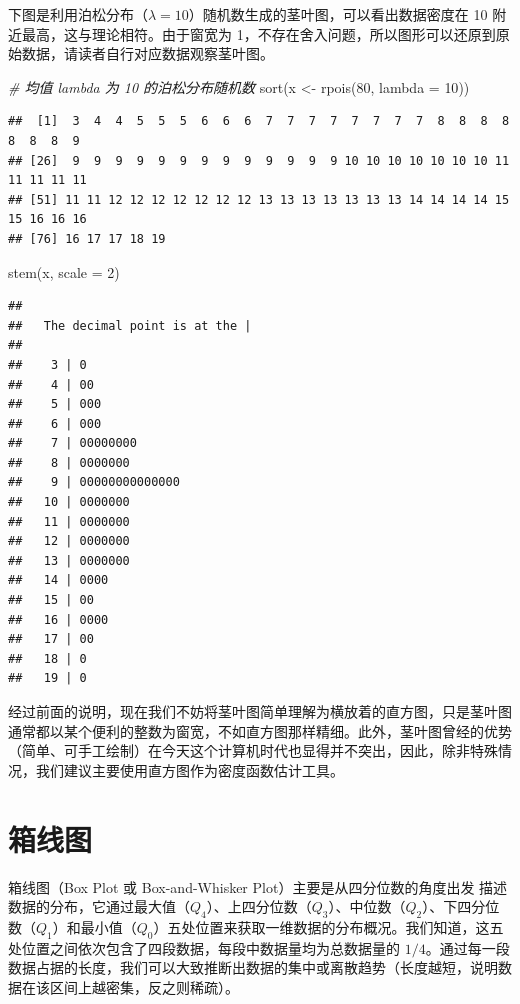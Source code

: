 \documentclass[
  b5paper,
  UTF8,twoside]{book}
\newenvironment{Shaded}{\begin{snugshade}}{\end{snugshade}}
\newcommand{\AttributeTok}[1]{\textcolor[rgb]{0.77,0.63,0.00}{#1}}
\newcommand{\CommentTok}[1]{\textcolor[rgb]{0.56,0.35,0.01}{\textit{#1}}}
\newcommand{\DecValTok}[1]{\textcolor[rgb]{0.00,0.00,0.81}{#1}}
\newcommand{\FunctionTok}[1]{\textcolor[rgb]{0.00,0.00,0.00}{#1}}
\newcommand{\NormalTok}[1]{#1}
\newcommand{\OtherTok}[1]{\textcolor[rgb]{0.56,0.35,0.01}{#1}}
\begin{document}
下图是利用泊松分布（\(\lambda=10\)）随机数生成的茎叶图，可以看出数据密度在 10 附近最高，这与理论相符。由于窗宽为 1，不存在舍入问题，所以图形可以还原到原始数据，请读者自行对应数据观察茎叶图。

\begin{Shaded}
\begin{Highlighting}[]
\CommentTok{\# 均值 lambda 为 10 的泊松分布随机数}
\FunctionTok{sort}\NormalTok{(x }\OtherTok{\textless{}{-}} \FunctionTok{rpois}\NormalTok{(}\DecValTok{80}\NormalTok{, }\AttributeTok{lambda =} \DecValTok{10}\NormalTok{))}
\end{Highlighting}
\end{Shaded}

\begin{verbatim}
##  [1]  3  4  4  5  5  5  6  6  6  7  7  7  7  7  7  7  7  8  8  8  8  8  8  8  9
## [26]  9  9  9  9  9  9  9  9  9  9  9  9  9 10 10 10 10 10 10 10 11 11 11 11 11
## [51] 11 11 12 12 12 12 12 12 12 13 13 13 13 13 13 13 14 14 14 14 15 15 16 16 16
## [76] 16 17 17 18 19
\end{verbatim}

\begin{Shaded}
\begin{Highlighting}[]
\FunctionTok{stem}\NormalTok{(x, }\AttributeTok{scale =} \DecValTok{2}\NormalTok{)}
\end{Highlighting}
\end{Shaded}

\begin{verbatim}
## 
##   The decimal point is at the |
## 
##    3 | 0
##    4 | 00
##    5 | 000
##    6 | 000
##    7 | 00000000
##    8 | 0000000
##    9 | 00000000000000
##   10 | 0000000
##   11 | 0000000
##   12 | 0000000
##   13 | 0000000
##   14 | 0000
##   15 | 00
##   16 | 0000
##   17 | 00
##   18 | 0
##   19 | 0
\end{verbatim}

经过前面的说明，现在我们不妨将茎叶图简单理解为横放着的直方图，只是茎叶图通常都以某个便利的整数为窗宽，不如直方图那样精细。此外，茎叶图曾经的优势（简单、可手工绘制）在今天这个计算机时代也显得并不突出，因此，除非特殊情况，我们建议主要使用直方图作为密度函数估计工具。

\hypertarget{sec:boxplot}{%
\section{箱线图}\label{sec:boxplot}}

箱线图（Box Plot 或 Box-and-Whisker Plot）主要是从四分位数的角度出发
描述数据的分布，它通过最大值（\(Q_4\)）、上四分位数（\(Q_3\)）、中位数（\(Q_2\)）、下四分位数（\(Q_1\)）和最小值（\(Q_0\)）五处位置来获取一维数据的分布概况。我们知道，这五处位置之间依次包含了四段数据，每段中数据量均为总数据量的 \(1/4\)。通过每一段数据占据的长度，我们可以大致推断出数据的集中或离散趋势（长度越短，说明数据在该区间上越密集，反之则稀疏）。
\end{document}
